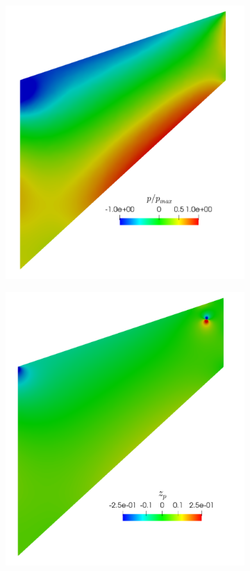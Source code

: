 \begin{figure}[ht!]
\centering
\begin{subfigure}{.33\textwidth}
\centering
\includegraphics[width=.9\linewidth]{img/mech_cooks_pw_p.png}
\end{subfigure}%
\begin{subfigure}{.33\textwidth}
\centering
\includegraphics[width=.9\linewidth]{img/mech_cooks_pw_zp.png}

\end{subfigure}
\end{figure}
